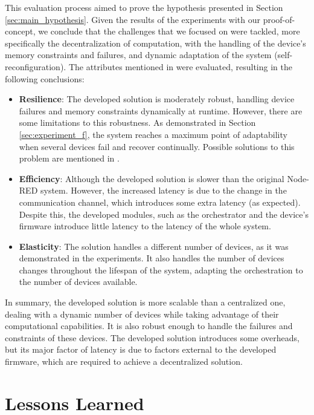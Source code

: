 This evaluation process aimed to prove the hypothesis presented in Section \ref{sec:main_hypothesis}. Given the results of the experiments with our proof-of-concept, we conclude that the challenges that we focused on were tackled, more specifically the decentralization of computation, with the handling of the device's memory constraints and failures, and dynamic adaptation of the system (self-reconfiguration). The attributes mentioned in  were evaluated, resulting in the following conclusions:

\begin{itemize}
    \item \textbf{Resilience}: The developed solution is moderately robust, handling device failures and memory constraints dynamically at runtime. However, there are some limitations to this robustness. As demonstrated in Section \ref{sec:experiment_f}, the system reaches a maximum point of adaptability when several devices fail and recover continually. Possible solutions to this problem are mentioned in .
    \item \textbf{Efficiency}: Although the developed solution is slower than the original Node-RED system. However, the increased latency is due to the change in the communication channel, which introduces some extra latency (as expected). Despite this, the developed modules, such as the orchestrator and the device's firmware introduce little latency to the latency of the whole system.
    \item \textbf{Elasticity}: The solution handles a different number of devices, as it was demonstrated in the experiments. It also handles the number of devices changes throughout the lifespan of the system, adapting the orchestration to the number of devices available.
\end{itemize}

In summary, the developed solution is more scalable than a centralized one, dealing with a dynamic number of devices while taking advantage of their computational capabilities. It is also robust enough to handle the failures and constraints of these devices. The developed solution introduces some overheads, but its major factor of latency is due to factors external to the developed firmware, which are required to achieve a decentralized solution.

\section{Lessons Learned}\label{sec:evaluation_lessons_learned}

